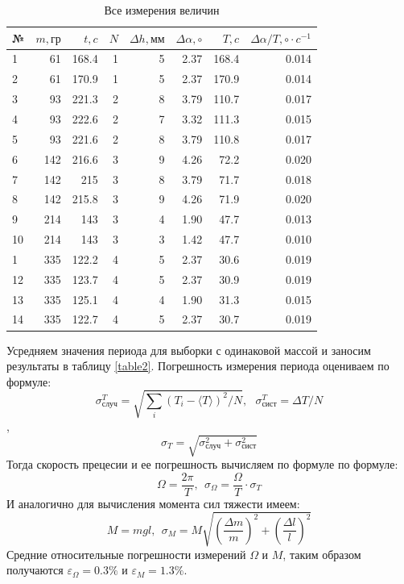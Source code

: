 \documentclass[a4paper,12pt]{article} %
\begin{document}
\begin{table}[!h]
\begin{center}
\label{table1}
\begin{tabular}{|l|r|r|r|r|r|r|r|} \hline
        №  & $m,гр$ & $t,c$ & $N$ & $\Delta h, \text{мм}$ & $\Delta \alpha,\circ  $ & $T,c$ & $\Delta\alpha /T, \circ \cdot c^{-1} $ \\ \hline
        1  &  61  &  168.4 &  1 &  5 &  2.37 &  168.4 &  0.014\\ \hline
        2  &  61  &  170.9 &  1 &  5 &  2.37 &  170.9 &  0.014\\ \hline
        3  &  93  &  221.3 &  2 &  8 &  3.79 &  110.7 &  0.017\\ \hline
        4  &  93  &  222.6 &  2 &  7 &  3.32 &  111.3 &  0.015\\ \hline
        5  &  93  &  221.6 &  2 &  8 &  3.79 &  110.8 &  0.017\\ \hline
        6  &  142 &  216.6 &  3 &  9 &  4.26 &  72.2  &  0.020\\ \hline
        7  &  142 &  215   &  3 &  8 &  3.79 &  71.7  &  0.018\\ \hline
        8  &  142 &  215.8 &  3 &  9 &  4.26 &  71.9  &  0.020\\ \hline
        9  &  214 &  143   &  3 &  4 &  1.90 &  47.7  &  0.013\\ \hline
        10 &  214 &  143   &  3 &  3 &  1.42 &  47.7  &  0.010\\ \hline
        1 &  335 &  122.2 &  4 &  5 &  2.37 &  30.6  &  0.019\\ \hline
        12 &  335 &  123.7 &  4 &  5 &  2.37 &  30.9  &  0.019\\ \hline
        13 &  335 &  125.1 &  4 &  4 &  1.90 &  31.3  &  0.015\\ \hline
        14 &  335 &  122.7 &  4 &  5 &  2.37 &  30.7  &  0.019\\ \hline
\end{tabular}
\caption{Все измерения величин}
\end{center}
\end{table}
 
Усредняем значения периода для выборки с одинаковой массой и заносим результаты в таблицу \ref{table2}.
Погрешность измерения периода оцениваем по формуле:
$$\sigma^T_\text{случ}=\sqrt{\sum_{i} (T_{i}-\langle T \rangle)^2 /N }, \ \ \ \sigma^T_\text{сист}=\Delta T/ N$$,
$$\sigma_{T}=\sqrt{\sigma^2_\text{случ}+\sigma^2_\text{сист}}$$
Тогда скорость прецесии и ее погрешность вычисляем по формуле по формуле:
$$\Omega=\frac{2\pi}{T}, \ \ \sigma_{\Omega}=\frac{\Omega}{T}\cdot \sigma_{T}$$
И аналогично для вычисления момента сил тяжести имеем:
$$M=mgl, \ \ \sigma_{M}=M\sqrt{\left(\dfrac{\Delta m}{m}\right)^2+\left(\dfrac{\Delta l}{l}\right)^2}$$
Средние относительные погрешности измерений $\Omega$ и $M$, таким образом получаются $\varepsilon_{\Omega}=0.3\% $ и $\varepsilon_{M}=1.3 \%$.
\end{document}
